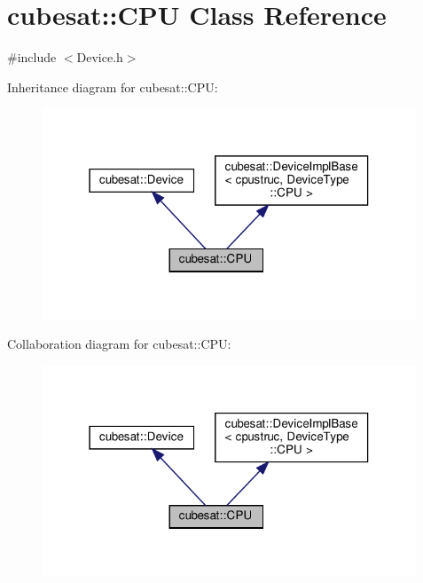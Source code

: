 \hypertarget{classcubesat_1_1CPU}{}\section{cubesat\+:\+:C\+PU Class Reference}
\label{classcubesat_1_1CPU}


{\ttfamily \#include $<$Device.\+h$>$}



Inheritance diagram for cubesat\+:\+:C\+PU\+:
\nopagebreak
\begin{figure}[H]
\begin{center}
\leavevmode
\includegraphics[width=316pt]{classcubesat_1_1CPU__inherit__graph}
\end{center}
\end{figure}


Collaboration diagram for cubesat\+:\+:C\+PU\+:
\nopagebreak
\begin{figure}[H]
\begin{center}
\leavevmode
\includegraphics[width=316pt]{classcubesat_1_1CPU__coll__graph}
\end{center}
\end{figure}
